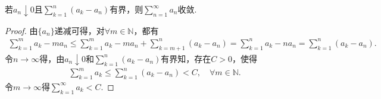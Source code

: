 \documentclass[../../main.tex]{subfiles}%
\begin{document}
\begin{proposition}
若$a_n \downarrow 0$且$\sum_{k=1}^n \left( a_k - a_n \right)$有界，则$\sum_{n=1}^{\infty} a_n$收敛.
\end{proposition}
\begin{proof}

由$\{a_n\}$递减可得，对$\forall m \in \mathbb{N}$，都有
\begin{align*}
\sum_{k=1}^m a_k - m a_n \leqslant \sum_{k=1}^m a_k - m a_n + \sum_{k=m+1}^n \left( a_k - a_n \right) = \sum_{k=1}^n a_k - n a_n = \sum_{k=1}^n \left( a_k - a_n \right).
\end{align*}
令$n \rightarrow \infty$得，由$a_n \downarrow 0$和$\sum_{k=1}^n \left( a_k - a_n \right)$有界知，存在$C > 0$，使得
\begin{align*}
\sum_{k=1}^m a_k \leqslant \sum_{k=1}^n \left( a_k - a_n \right) < C, \quad \forall m \in \mathbb{N}.
\end{align*}
令$m \rightarrow \infty$得$\sum_{k=1}^{\infty} a_k < C$.

\end{proof}
\end{document}
